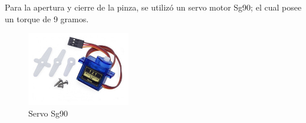 \FloatBarrier
Para la apertura y cierre de la pinza, se utilizó un servo motor Sg90; el cual posee
un torque de 9 gramos.
\begin{figure}[!htb]
  \begin{center}
    \includegraphics[width=0.4\textwidth]{imagenes/servo.jpg}
  \end{center}
  \caption{Servo Sg90}
  \label{fig:servo}
\end{figure}


